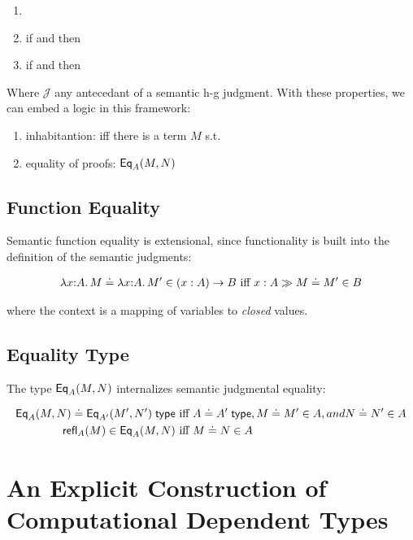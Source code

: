 \documentclass{article} \usepackage{chtt-notes} \usepackage{stmaryrd}
\begin{document}
\begin{enumerate}
\item {}
\item if  and  then 
\item if  and  then 
\end{enumerate} 

Where $\mathcal{J}$ any antecedant of a semantic h-g judgment. With these properties, we can embed a logic in 
this framework: 
\begin{enumerate}
\item inhabitantion:  iff there is a term $M$ s.t. 
\item equality of proofs: $\mathsf{Eq}_{A}(M,N)$
\end{enumerate}

\subsection{Function Equality}

Semantic function equality is extensional, since functionality is built into the definition of the semantic
judgments:

\begin{align*}
\hasEEC{\lam{x}{A}{M}}{\lam{x}{A}{M'}}{\Pitype{x}{A}{B}} &\text{ iff } \hasEEC{x : A}{M}{M'}{B}\\
\end{align*}

where the context is a mapping of variables to \emph{closed} values.

\subsection{Equality Type}

The type $\mathsf{Eq}_{A}(M,N)$ internalizes semantic judgmental equality: 

\begin{align*}
\hasTEC{\Eq{A}{M}{N}}{\Eq{A'}{M'}{N'}} &\text{ iff } \hasTEC{A}{A'}, \hasEEC{M}{M'}{A}, and \hasEEC{N}{N'}{A}\\
\hasEC{\refl{A}{M}}{\Eq{A}{M}{N}} &\text{ iff } \hasEEC{M}{N}{A}\\
\end{align*}

\section{An Explicit Construction of Computational Dependent Types}
\end{document}

